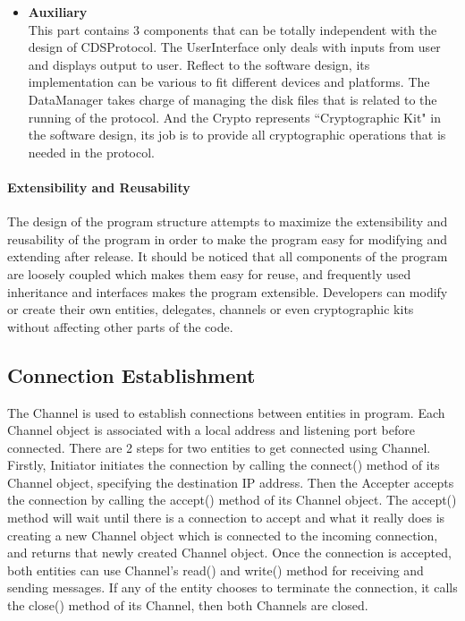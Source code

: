 \begin{itemize}
\item \textbf{Auxiliary} \\
This part contains 3 components that can be totally independent with the design of CDSProtocol. The UserInterface only deals with inputs from user and displays output to user. Reflect to the software design, its implementation can be various to fit different devices and platforms. The DataManager takes charge of managing the disk files that is related to the running of the protocol. And the Crypto represents ``Cryptographic Kit" in the software design, its job is to provide all cryptographic operations that is needed in the protocol.
\end{itemize}

\paragraph{Extensibility and Reusability}
The design of the program structure attempts to maximize the extensibility and reusability of the program in order to make the program easy for modifying and extending after release. It should be noticed that all components of the program are loosely coupled which makes them easy for reuse, and frequently used inheritance and interfaces makes the program extensible. Developers can modify or create their own entities, delegates, channels or even cryptographic kits without affecting other parts of the code. 

\subsection{Connection Establishment}
The Channel is used to establish connections between entities in program. Each Channel object is associated with a local address and listening port before connected. There are 2 steps for two entities to get connected using Channel. Firstly, Initiator initiates the connection by calling the connect() method of its Channel object, specifying the destination IP address. Then the Accepter accepts the connection by calling the accept() method of its Channel object. The accept() method will wait until there is a connection to accept and what it really does is creating a new Channel object which is connected to the incoming connection, and returns that newly created Channel object. Once the connection is accepted, both entities can use Channel's read() and write() method for receiving and sending messages. If any of the entity chooses to terminate the connection, it calls the close() method of its Channel, then both Channels are closed.

